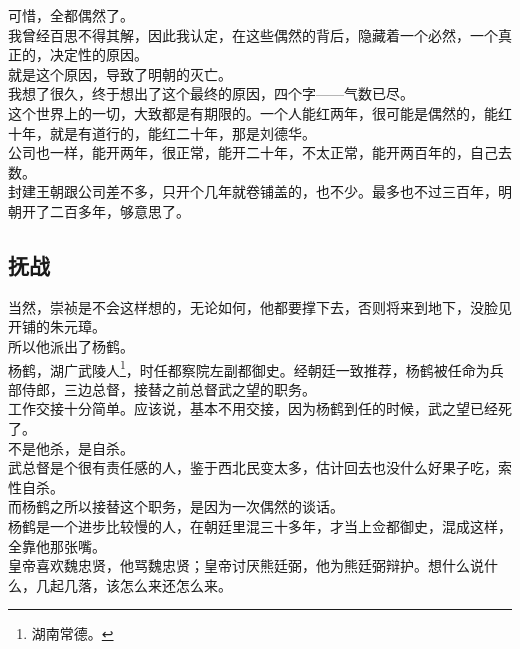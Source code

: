 \begin{multicols}{\theparacolNo}
可惜，全都偶然了。\\

我曾经百思不得其解，因此我认定，在这些偶然的背后，隐藏着一个必然，一个真正的，决定性的原因。\\

就是这个原因，导致了明朝的灭亡。\\

我想了很久，终于想出了这个最终的原因，四个字——气数已尽。\\

这个世界上的一切，大致都是有期限的。一个人能红两年，很可能是偶然的，能红十年，就是有道行的，能红二十年，那是刘德华。\\

公司也一样，能开两年，很正常，能开二十年，不太正常，能开两百年的，自己去数。\\

封建王朝跟公司差不多，只开个几年就卷铺盖的，也不少。最多也不过三百年，明朝开了二百多年，够意思了。\\

\subsection{抚战}
当然，崇祯是不会这样想的，无论如何，他都要撑下去，否则将来到地下，没脸见开铺的朱元璋。\\

所以他派出了杨鹤。\\

杨鹤，湖广武陵人\footnote{湖南常德。}，时任都察院左副都御史。经朝廷一致推荐，杨鹤被任命为兵部侍郎，三边总督，接替之前总督武之望的职务。\\

工作交接十分简单。应该说，基本不用交接，因为杨鹤到任的时候，武之望已经死了。\\

不是他杀，是自杀。\\

武总督是个很有责任感的人，鉴于西北民变太多，估计回去也没什么好果子吃，索性自杀。\\

而杨鹤之所以接替这个职务，是因为一次偶然的谈话。\\

杨鹤是一个进步比较慢的人，在朝廷里混三十多年，才当上佥都御史，混成这样，全靠他那张嘴。\\

皇帝喜欢魏忠贤，他骂魏忠贤；皇帝讨厌熊廷弼，他为熊廷弼辩护。想什么说什么，几起几落，该怎么来还怎么来。\\


\end{multicols}
